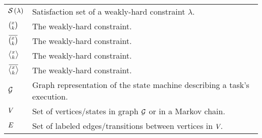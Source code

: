 \begin{table*}[h]
\begin{tabular}{l|l}
        $\mathcal{S}_{}\,(\lambda)$ & Satisfaction set of a weakly-hard constraint $\lambda$. \\
        $\binom{x_{}}{k_{}}$ & The \tAH{} weakly-hard constraint. \\
        $\anymiss{}$ & The \tAM{} weakly-hard constraint. \\
        $\rowhit{}$ & The \tRH{} weakly-hard constraint. \\
        $\rowmiss{}$ & The \tRM{} weakly-hard constraint. \\
        $\mathcal{G}_{}$ & Graph representation of the state machine describing a task's execution. \\
        $V_{}$ & Set of vertices/states in graph $\mathcal{G}_{}$ or in a Markov chain. \\
        $E_{}$ & Set of labeled edges/transitions between vertices in $V_{}$. \\
    \end{tabular}
\end{table*}
